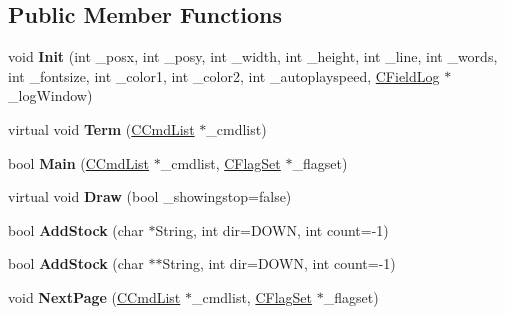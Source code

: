 \subsection*{Public Member Functions}
\begin{DoxyCompactItemize}
\item 
void {\bfseries Init} (int \+\_\+posx, int \+\_\+posy, int \+\_\+width, int \+\_\+height, int \+\_\+line, int \+\_\+words, int \+\_\+fontsize, int \+\_\+color1, int \+\_\+color2, int \+\_\+autoplayspeed, \hyperlink{class_c_field_log}{C\+Field\+Log} $\ast$\+\_\+log\+Window)\hypertarget{class_c_text_box_ad1e1baa450dce91e33d3d55de3db6f66}{}\label{class_c_text_box_ad1e1baa450dce91e33d3d55de3db6f66}

\item 
virtual void {\bfseries Term} (\hyperlink{class_c_cmd_list}{C\+Cmd\+List} $\ast$\+\_\+cmdlist)\hypertarget{class_c_text_box_a1cc1c4041f1c01dc807ae12fe5d67aef}{}\label{class_c_text_box_a1cc1c4041f1c01dc807ae12fe5d67aef}

\item 
bool {\bfseries Main} (\hyperlink{class_c_cmd_list}{C\+Cmd\+List} $\ast$\+\_\+cmdlist, \hyperlink{class_c_flag_set}{C\+Flag\+Set} $\ast$\+\_\+flagset)\hypertarget{class_c_text_box_a03fd29ccba104eb4728077ec505de351}{}\label{class_c_text_box_a03fd29ccba104eb4728077ec505de351}

\item 
virtual void {\bfseries Draw} (bool \+\_\+showingstop=false)\hypertarget{class_c_text_box_a37a13a78ccab5d554538a7289f654a3c}{}\label{class_c_text_box_a37a13a78ccab5d554538a7289f654a3c}

\item 
bool {\bfseries Add\+Stock} (char $\ast$String, int dir=D\+O\+WN, int count=-\/1)\hypertarget{class_c_text_box_a3f57fdc2e13a0f3e97a15df497bcee0d}{}\label{class_c_text_box_a3f57fdc2e13a0f3e97a15df497bcee0d}

\item 
bool {\bfseries Add\+Stock} (char $\ast$$\ast$String, int dir=D\+O\+WN, int count=-\/1)\hypertarget{class_c_text_box_a108213bf12542ecaf088e6fcbb3f8165}{}\label{class_c_text_box_a108213bf12542ecaf088e6fcbb3f8165}

\item 
void {\bfseries Next\+Page} (\hyperlink{class_c_cmd_list}{C\+Cmd\+List} $\ast$\+\_\+cmdlist, \hyperlink{class_c_flag_set}{C\+Flag\+Set} $\ast$\+\_\+flagset)\hypertarget{class_c_text_box_aa73ba00db6a70351678641c9b63afe3e}{}\label{class_c_text_box_aa73ba00db6a70351678641c9b63afe3e}


\end{DoxyCompactItemize}
